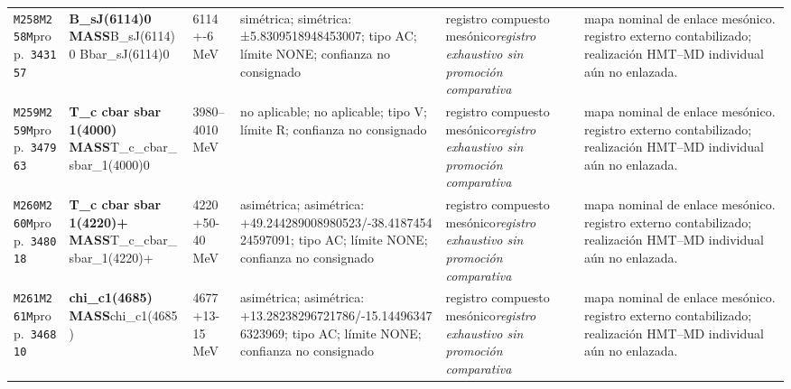 \begin{landscape}
\begin{longtable}{L{1.85cm}L{4.45cm}L{2.35cm}L{4.05cm}L{3.35cm}L{7.15cm}}
\texttt{M258}\newline \texttt{M258M}\newline prop.\ \texttt{343157} & \textbf{B\_\allowbreak{}sJ(6114)0 MASS}\newline B\_\allowbreak{}sJ(6114)0 \textbar{}\allowbreak{} Bbar\_\allowbreak{}sJ(6114)0 & 6114+-6\,MeV & simétrica; simétrica: ±5.8309518948453007; tipo AC; límite NONE; confianza no consignado & registro compuesto mesónico\newline \emph{registro exhaustivo sin promoción comparativa} & mapa nominal de enlace mesónico. registro externo contabilizado; realización HMT--MD individual aún no enlazada. \\
\texttt{M259}\newline \texttt{M259M}\newline prop.\ \texttt{347963} & \textbf{T\_\allowbreak{}c cbar sbar 1(4000) MASS}\newline T\_\allowbreak{}c\_\allowbreak{}cbar\_\allowbreak{}sbar\_\allowbreak{}1(4000)0 & 3980--4010\,MeV & no aplicable; no aplicable; tipo V; límite R; confianza no consignado & registro compuesto mesónico\newline \emph{registro exhaustivo sin promoción comparativa} & mapa nominal de enlace mesónico. registro externo contabilizado; realización HMT--MD individual aún no enlazada. \\
\texttt{M260}\newline \texttt{M260M}\newline prop.\ \texttt{348018} & \textbf{T\_\allowbreak{}c cbar sbar 1(4220)+ MASS}\newline T\_\allowbreak{}c\_\allowbreak{}cbar\_\allowbreak{}sbar\_\allowbreak{}1(4220)+ & 4220+50-40\,MeV & asimétrica; asimétrica: +49.244289008980523/-38.418745424597091; tipo AC; límite NONE; confianza no consignado & registro compuesto mesónico\newline \emph{registro exhaustivo sin promoción comparativa} & mapa nominal de enlace mesónico. registro externo contabilizado; realización HMT--MD individual aún no enlazada. \\
\texttt{M261}\newline \texttt{M261M}\newline prop.\ \texttt{346810} & \textbf{chi\_\allowbreak{}c1(4685) MASS}\newline chi\_\allowbreak{}c1(4685) & 4677+13-15\,MeV & asimétrica; asimétrica: +13.28238296721786/-15.144963476323969; tipo AC; límite NONE; confianza no consignado & registro compuesto mesónico\newline \emph{registro exhaustivo sin promoción comparativa} & mapa nominal de enlace mesónico. registro externo contabilizado; realización HMT--MD individual aún no enlazada. \\

\end{longtable}
\end{landscape}
